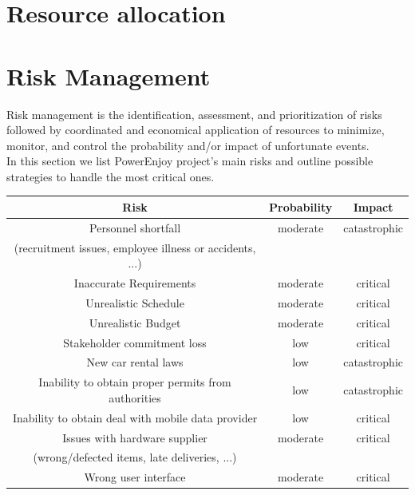 \documentclass[english]{article}
\begin{document}
\section{Resource allocation}


\section{Risk Management}
Risk management is the identification, assessment, and prioritization of risks followed by coordinated and economical application of resources to minimize, monitor, and control the probability and/or impact of unfortunate events.\\
In this section we list PowerEnjoy project's main risks and outline possible strategies to handle the most critical ones.


\begin{center}
	\begin{tabular}{|c|c|c|}
		\hline
		\textbf{Risk} & \textbf{Probability } &  \textbf{Impact} \\
		\hline
		Personnel shortfall & moderate & catastrophic\\(recruitment issues, employee illness or accidents, ...) & & \\
		\hline
		Inaccurate Requirements & moderate & critical\\
		\hline
		Unrealistic Schedule & moderate & critical\\
		\hline
		Unrealistic Budget & moderate & critical\\
		\hline
		Stakeholder commitment loss & low & critical\\
		\hline
		New car rental laws & low & catastrophic \\
		\hline
		Inability to obtain proper permits from authorities  & low & catastrophic \\
		\hline
		Inability to obtain deal with mobile data provider  & low & critical \\
		\hline		
		Issues with hardware supplier & moderate & critical \\
		(wrong/defected items, late deliveries, ...) & & \\
		\hline
		Wrong user interface & moderate & critical\\
		\hline
	\end{tabular}
\end{center}
\end{document}
